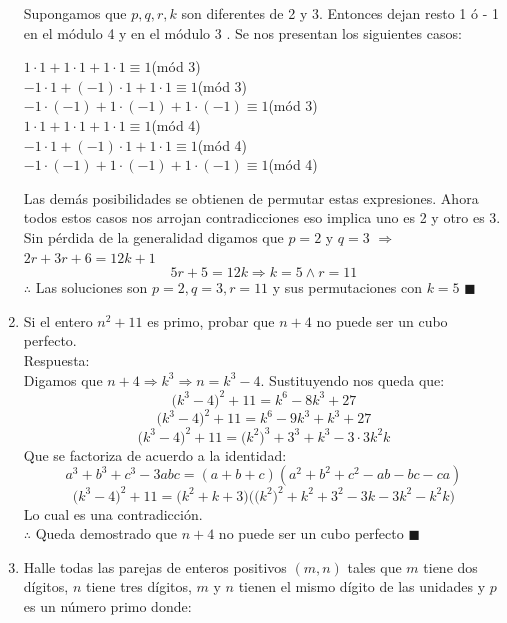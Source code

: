 \documentclass{book}
\begin{document}
\begin{enumerate}
        Supongamos que $p,q,r,k$ son diferentes de 2 y 3. Entonces dejan resto 1 ó - 1 en el módulo 4 y en el módulo 3 . Se nos presentan los siguientes casos:
        \begin{center}
            $1 \cdot 1 + 1 \cdot 1 + 1 \cdot 1 \equiv 1$(mód 3) \\
            $-1 \cdot 1 + (-1) \cdot 1 + 1 \cdot 1 \equiv 1$(mód 3)\\
            $-1 \cdot (-1) + 1 \cdot (-1) + 1 \cdot (-1) \equiv 1$(mód 3)\\
            $1 \cdot 1 + 1 \cdot 1 + 1 \cdot 1 \equiv 1$(mód 4)\\
            $-1 \cdot 1 + (-1) \cdot 1 + 1 \cdot 1 \equiv 1$(mód 4) \\
            $-1 \cdot (-1) + 1 \cdot (-1) + 1 \cdot (-1) \equiv 1$(mód 4) \\
        \end{center}
        Las demás posibilidades se obtienen de permutar estas expresiones. Ahora todos estos casos nos arrojan contradicciones eso implica uno es 2 y otro es 3.\\
        Sin pérdida de la generalidad digamos que $p= 2$ y $q= 3$ $\Rightarrow$ $2r + 3r + 6 = 12k + 1$
        $$5r + 5 = 12k \Rightarrow k = 5 \wedge r= 11$$
        $\therefore$ Las soluciones son $p= 2, q= 3, r= 11$ y sus permutaciones con $k= 5$ $\blacksquare$ \\
        \item Si el entero $n^2 + 11$ es primo, probar que $n + 4$ no puede ser un cubo perfecto.\\
        Respuesta:\\
        Digamos que $n + 4 \Rightarrow k^3\Rightarrow n = k^3 - 4$. Sustituyendo nos queda que:
        $$\big(k^3 - 4\big)^2 + 11 = k^6 - 8k^3 + 27$$
        $$\big(k^3 - 4\big)^2 + 11 = k^6 - 9k^3 + k^3 + 27$$
        $$\big(k^3 - 4\big)^2 + 11 = \big(k^2\big)^3 + 3^3 + k^3 - 3 \cdot 3k^2k$$
        Que se factoriza de acuerdo a la identidad:
        $$a^3 + b^3 + c^3 - 3abc = (a + b + c)(a^2 + b^2 + c^2 - ab - bc - ca)$$
        $$\big(k^3 - 4\big)^2 + 11 = \big(k^2 + k + 3\big)\big(\big(k^2\big)^2 + k^2 + 3^2 - 3k - 3k^2 - k^2k\big)$$
        Lo cual es una contradicción. \\
        $\therefore$ Queda demostrado que $n + 4$ no puede ser un cubo perfecto $\blacksquare$\\
        \item  Halle todas las parejas de enteros positivos $(m,n)$ tales que $m$ tiene dos dígitos, $n$ tiene tres dígitos, $m$ y                    $n$ tienen el mismo dígito de las unidades y $p$ es un número primo donde:

\end{enumerate}
\end{document}
